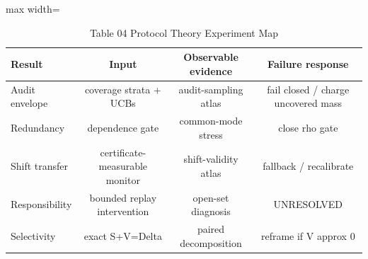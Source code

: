 \begin{table}[tbp]
\centering
\footnotesize
\caption{Table 04 Protocol Theory Experiment Map}
\label{tab:table_04_protocol_theory_experiment_map}
\begin{adjustbox}{max width=\linewidth}
\begin{tabular}{lccc}
\toprule
Result & Input & Observable evidence & Failure response \\
\midrule
Audit envelope & coverage strata + UCBs & audit-sampling atlas & fail closed / charge uncovered mass \\
Redundancy & dependence gate & common-mode stress & close rho gate \\
Shift transfer & certificate-measurable monitor & shift-validity atlas & fallback / recalibrate \\
Responsibility & bounded replay intervention & open-set diagnosis & UNRESOLVED \\
Selectivity & exact S+V=Delta & paired decomposition & reframe if V approx 0 \\
\bottomrule
\end{tabular}
\end{adjustbox}
\end{table}
